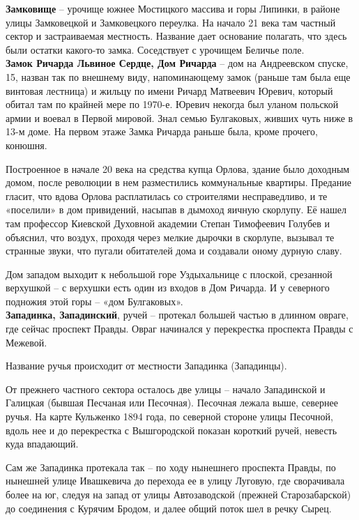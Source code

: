 \textbf{Замковище} – урочище южнее Мостицкого массива и горы Липинки, в районе улицы Замковецкой и Замковецкого переулка. На начало 21 века там частный сектор и застраиваемая местность. Название дает основание полагать, что здесь были остатки какого-то замка. Соседствует с урочищем Беличье поле.\\

\textbf{Замок Ричарда Львиное Сердце, Дом Ричарда} – дом на Андреевском спуске, 15, назван так по внешнему виду, напоминающему замок (раньше там была еще винтовая лестница) и жильцу по имени Ричард Матвеевич Юревич, который обитал там по крайней мере по 1970-е. Юревич некогда был уланом польской армии и воевал в Первой мировой. Знал семью Булгаковых, живших чуть ниже в 13-м доме. На первом этаже Замка Ричарда раньше была, кроме прочего, конюшня.

Построенное в начале 20 века на средства купца Орлова, здание было доходным домом, после революции в нем разместились коммунальные квартиры. Предание гласит, что вдова Орлова расплатилась со строителями несправедливо, и те «поселили» в дом привидений, насыпав в дымоход яичную скорлупу. Её нашел там профессор Киевской Духовной академии Степан Тимофеевич Голубев и объяснил, что воздух, проходя через мелкие дырочки в скорлупе, вызывал те странные
звуки, что пугали обитателей дома и создавали оному дурную славу.

Дом западом выходит к небольшой горе Уздыхальнице с плоской, срезанной верхушкой – с верхушки есть один из входов в Дом Ричарда. И у северного подножия этой горы – «дом Булгаковых».\\ 

\textbf{Западинка, Западинский}, ручей – протекал большей частью в длинном овраге, где сейчас проспект Правды. Овраг начинался у перекрестка проспекта Правды с Межевой.
 
Название ручья происходит от местности Западинка (Западинцы). 

От прежнего частного сектора осталось две улицы – начало Западинской и Галицкая (бывшая Песчаная или Песочная). Песочная лежала выше, севернее ручья. На карте Кульженко 1894 года, по северной стороне улицы Песочной, вдоль нее и до перекрестка с Вышгородской показан короткий ручей, невесть куда впадающий.

Сам же Западинка протекала так – по ходу нынешнего проспекта Правды, по нынешней улице Ивашкевича до перехода ее в улицу Луговую, где сворачивала более на юг, следуя на запад от улицы Автозаводской (прежней Старозабарской) до соединения с Курячим Бродом, и далее общий поток шел в речку Сырец.

